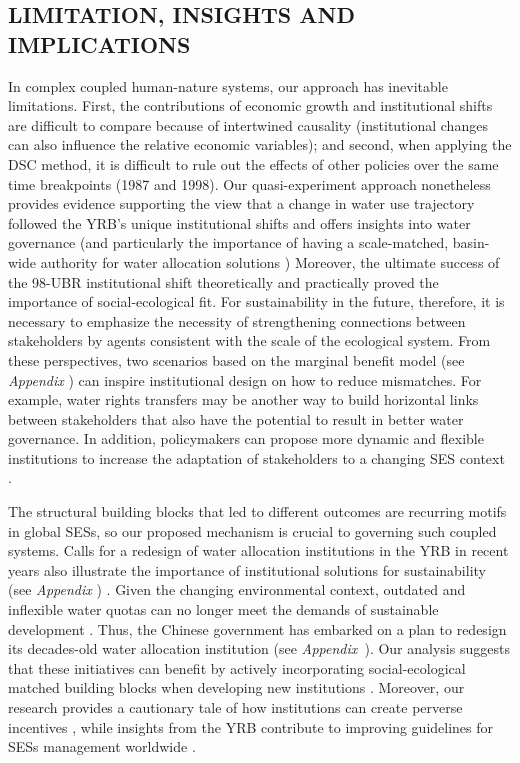 \subsection{LIMITATION, INSIGHTS AND IMPLICATIONS}
\label{discussion-4}

In complex coupled human-nature systems, our approach has inevitable limitations.
First, the contributions of economic growth and institutional shifts are difficult to compare because of intertwined causality (institutional changes can also influence the relative economic variables);
and second, when applying the DSC method, it is difficult to rule out the effects of other policies over the same time breakpoints (1987 and 1998).
Our quasi-experiment approach nonetheless provides evidence supporting the view that a change in water use trajectory followed the YRB's unique institutional shifts and offers insights into water governance (and particularly the importance of having a scale-matched, basin-wide authority for water allocation solutions \cite{bodin2017b, ostrom2009, reyers2018})
Moreover, the ultimate success of the 98-UBR institutional shift theoretically and practically proved the importance of social-ecological fit.
For sustainability in the future, therefore, it is necessary to emphasize the necessity of strengthening connections between stakeholders by agents consistent with the scale of the ecological system.
From these perspectives, two scenarios based on the marginal benefit model (see \textit{Appendix }) can inspire institutional design on how to reduce mismatches.
For example, water rights transfers may be another way to build horizontal links between stakeholders that also have the potential to result in better water governance.
In addition, policymakers can propose more dynamic and flexible institutions to increase the adaptation of stakeholders to a changing SES context \cite{reyers2018}.

The structural building blocks that led to different outcomes are recurring motifs in global SESs, so our proposed mechanism is crucial to governing such coupled systems.
Calls for a redesign of water allocation institutions in the YRB in recent years also illustrate the importance of institutional solutions for sustainability (see \textit{Appendix }) \cite{yu2019}.
Given the changing environmental context, outdated and inflexible water quotas can no longer meet the demands of sustainable development \cite{wang2019a}.
Thus, the Chinese government has embarked on a plan to redesign its decades-old water allocation institution (see \textit{Appendix~}).
Our analysis suggests that these initiatives can benefit by actively incorporating social-ecological matched building blocks when developing new institutions \cite{bodin2017b}.
Moreover, our research provides a cautionary tale of how institutions can create perverse incentives \cite{hegwood2022}, while insights from the YRB contribute to improving guidelines for SESs management worldwide \cite{muneepeerakul2017, leslie2015}.
